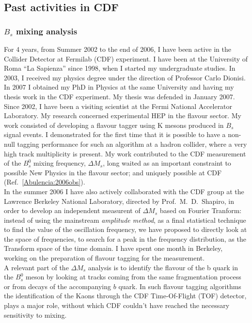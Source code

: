 \documentclass{article}
\begin{document}
\begin{vita}
\subsection*{Past activities in CDF}
\subsubsection*{$B_{s}$ mixing analysis}
For 4 years, from Summer 2002 to the end of 2006, I have been active in the Collider Detector at Fermilab (CDF) experiment. I have been at the University of Roma ``La Sapienza'' since 1998, when I started my undergraduate studies. In 2003, I received my physics degree under the direction of Professor Carlo Dionisi. In 2007 I obtained my PhD in Physics at the same University and having my thesis work in the CDF experiment. My thesis was defended in January 2007. Since 2002, I have been a visiting scientist at the Fermi National Accelerator Laboratory. My research concerned experimental HEP in the flavour sector. My work consisted of developing a flavour tagger using K mesons produced in $B_{s}$ signal events. I demonstrated for the first time that it is possible to have a non-null tagging performance for such an algorithm at a hadron collider, where a very high track multiplicity is present. My work contributed to the CDF measurement of the $B_{s}^{0}$ mixing frequency, $\Delta M_{s}$, long waited as an important constraint to possible New Physics in the flavour sector; and uniquely possible at CDF (Ref.~\ref{Abulencia:2006obs}).\\
In the summer 2006 I have also actively collaborated with the CDF group at the Lawrence Berkeley National Laboratory, directed by Prof.~M.~D.~Shapiro,  in order to develop an independent measurent of  $\Delta M_{s}$ based on Fourier Tranform: instead of using the mainstream {\it amplitude method}, as a final statistical technique to find the value of the oscillation frequency, we have proposed to directly look at the space of frequencies, to search for a peak in the frequency distribution, as the Transform space of the time domain. I have spent one month in Berkeley, working on the preparation of flavour tagging for the measurement. \\
\newline 
A relevant part of the $\Delta M_{s}$ analysis is to identify the flavour of the b quark in the $B_{s}^{0}$ meson by looking at tracks coming from the same fragmentation process or from decays of the accompanying $b$ quark. In such flavour tagging algorithms the identification of the Kaons through the CDF Time-Of-Flight (TOF) detector, plays a major role, without which CDF couldn't have reached the necessary sensitivity to mixing. 



\end{vita}
\end{document}
